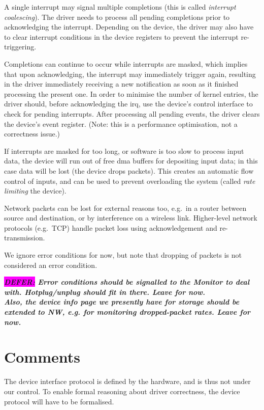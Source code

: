 \documentclass[a4paper,12pt]{report}
\newcommand{\DEFER}[1]{\textbf{\textsl{\colorbox{magenta}{DEFER:} #1}}}
\newcommand{\DEFER}[1]{\relax}
\begin{document}
A single interrupt
may signal multiple completions (this is called \emph{interrupt
  coalescing}). The driver needs to process all pending completions
prior to acknowledging the interrupt. Depending on the device, the
driver may also have to clear interrupt conditions in the device
registers to prevent the interrupt re-triggering.

Completions can continue to occur while interrupts are masked, which
implies that upon acknowledging, the interrupt may immediately trigger
again, resulting in the driver immediately receiving a new
notification as soon as it finished processing the present one. In
order to minimise the number of kernel entries, the driver should,
before acknowledging the \gls{irq}, use the device's control interface to
check for pending interrupts. After processing all pending events,
the driver clears the device's event register. (Note: this is a performance
optimisation, not a correctness issue.)

If interrupts are masked for too long, or software is too slow to
process input data, the device will run out of free \gls{dma} buffers
for depositing input data; in this case data will be lost
(the device drops packets). This creates an automatic flow control of inputs,
and can be used to prevent overloading the system (called \emph{rate
  limiting} the device).

Network packets can be lost for external reasons too, e.g.\ in a
router between source and destination, or by interference on a
wireless link. Higher-level network protocols
(e.g.\ TCP) handle packet loss using acknowledgement and re-transmission.

We ignore error conditions for now, but note that dropping of packets
is not considered an error condition.

\DEFER{Error conditions should be signalled to the Monitor to deal
  with. Hotplug/unplug should fit in there. Leave for now.\\
  Also, the device info page we presently have for storage should be
  extended to NW, e.g. for monitoring dropped-packet rates. Leave for now.}

\section{Comments}

The device interface protocol is defined by the hardware, and is thus not
under our control. To enable formal reasoning about driver
correctness, the device protocol will have to be formalised.
\end{document}
